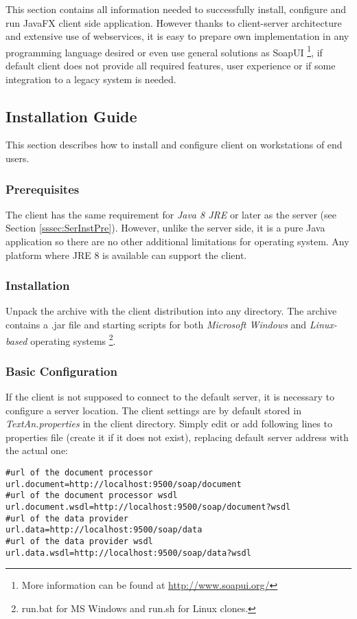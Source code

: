 
This section contains all information needed to successfully install, configure
and run \textan{} JavaFX client side application. However thanks to \textan{}
client-server architecture and extensive use of webservices, it is easy to
prepare own implementation in any programming language desired or even use
general solutions as SoapUI%
\footnote{More information can be found at \url{http://www.soapui.org/}},
if \textan{} default client does not provide all required features, user
experience or if some integration to a legacy system is needed.

\subsection{Installation Guide}

This section describes how to install and configure \textan{} client on
workstations of end users.

\subsubsection{Prerequisites}

The \textan{} client has the same requirement for \emph{Java 8 JRE} or later
as the server (see Section \ref{sssec:SerInstPre}). However, unlike the server
side, it is a pure Java application so there are no other additional limitations
for operating system. Any platform where JRE 8 is available can support the
client.

\subsubsection{Installation}

Unpack the archive with the \textan{} client distribution into any directory. 
The archive contains a .jar file and starting scripts for both
\emph{Microsoft Windows} and \emph{Linux-based} operating systems
\footnote{run.bat for MS Windows and run.sh for Linux clones.\label{runscript_note}}.

\subsubsection{Basic Configuration}
\label{sssec:BasicConf}

If the client is not supposed to connect to the default server, it is necessary
to configure a server location. The client settings are by default stored in
\emph{TextAn.properties}
in the client directory. Simply edit or add following lines to properties file
(create it if it does not exist), replacing default server address with the
actual one:
\begin{lstlisting}[frame=single,language=properties]
#url of the document processor
url.document=http://localhost:9500/soap/document
#url of the document processor wsdl
url.document.wsdl=http://localhost:9500/soap/document?wsdl
#url of the data provider
url.data=http://localhost:9500/soap/data
#url of the data provider wsdl
url.data.wsdl=http://localhost:9500/soap/data?wsdl
\end{lstlisting}

